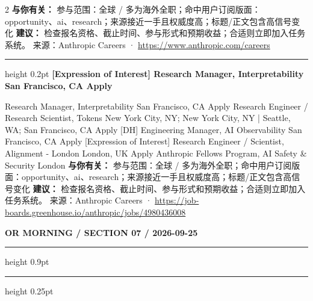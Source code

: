 \documentclass[10.5pt]{ctexart}
\begin{document}
\begin{multicols}{2}
\textbf{与你有关：} 参与范围：全球 / 多为海外全职；命中用户订阅版面：opportunity、ai、research；来源接近一手且权威度高；标题/正文包含高信号变化
\textbf{建议：} 检查报名资格、截止时间、参与形式和预期收益；合适则立即加入任务系统。
{\footnotesize\color{ormuted} 来源：Anthropic Careers · \url{https://www.anthropic.com/careers}}
\vspace{2mm}
\hrule height 0.2pt
\vspace{2mm}
{\large\bfseries [Expression of Interest] Research Manager, Interpretability San Francisco, CA Apply}\par
[Expression of Interest] Research Manager, Interpretability San Francisco, CA Apply Research Engineer / Research Scientist, Tokens New York City, NY; New York City, NY | Seattle, WA; San Francisco, CA Apply [DH] Engineering Manager, AI Observability San Francisco, CA Apply [Expression of Interest] Research Engineer / Scientist, Alignment - London London, UK Apply Anthropic Fellows Program, AI Safety \& Security London
\textbf{与你有关：} 参与范围：全球 / 多为海外全职；命中用户订阅版面：opportunity、ai、research；来源接近一手且权威度高；标题/正文包含高信号变化
\textbf{建议：} 检查报名资格、截止时间、参与形式和预期收益；合适则立即加入任务系统。
{\footnotesize\color{ormuted} 来源：Anthropic Careers · \url{https://job-boards.greenhouse.io/anthropic/jobs/4980436008}}
\end{multicols}
\newpage
{\small\bfseries OR MORNING / SECTION 07 / 2026-09-25}
\vspace{2mm}
\hrule height 0.9pt
\vspace{1.5mm}
\hrule height 0.25pt
\vspace{4mm}
\end{document}
